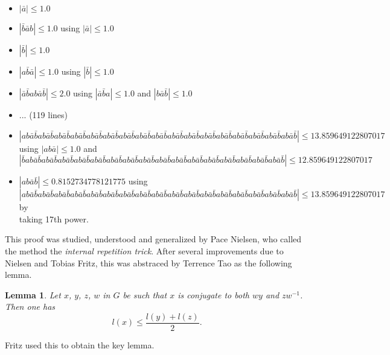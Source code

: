\documentclass{amsart}
\theoremstyle{plain}
\newtheorem{lemma}[theorem]{Lemma}
\theoremstyle{definition}
\theoremstyle{remark}
\begin{document}
{\tiny\begin{itemize}[leftmargin=*]
	\item $|\bar{a}| \leq 1.0$
	\item $|\bar{b}\bar{a}b| \leq 1.0$ using $|\bar{a}| \leq 1.0$
	\item $|\bar{b}| \leq 1.0$
	\item $|a\bar{b}\bar{a}| \leq 1.0$ using $|\bar{b}| \leq 1.0$
	\item $|\bar{a}\bar{b}ab\bar{a}\bar{b}| \leq 2.0$ using $|\bar{a}\bar{b}a| \leq 1.0$ and $|b\bar{a}\bar{b}| \leq 1.0$
	\item ... (119 lines)
	\item $|ab\bar{a}\bar{b}ab\bar{a}\bar{b}ab\bar{a}\bar{b}ab\bar{a}\bar{b}ab\bar{a}\bar{b}ab\bar{a}\bar{b}ab\bar{a}\bar{b}ab\bar{a}\bar{b}ab\bar{a}\bar{b}ab\bar{a}\bar{b}ab\bar{a}\bar{b}ab\bar{a}\bar{b}ab\bar{a}\bar{b}ab\bar{a}\bar{b}ab\bar{a}\bar{b}ab\bar{a}\bar{b}ab\bar{a}\bar{b}| \leq 13.859649122807017$ \\ using $|ab\bar{a}| \leq 1.0$ and \\ $|\bar{b}ab\bar{a}\bar{b}ab\bar{a}\bar{b}ab\bar{a}\bar{b}ab\bar{a}\bar{b}ab\bar{a}\bar{b}ab\bar{a}\bar{b}ab\bar{a}\bar{b}ab\bar{a}\bar{b}ab\bar{a}\bar{b}ab\bar{a}\bar{b}ab\bar{a}\bar{b}ab\bar{a}\bar{b}ab\bar{a}\bar{b}ab\bar{a}\bar{b}ab\bar{a}\bar{b}ab\bar{a}\bar{b}| \leq 12.859649122807017$
	\item $|ab\bar{a}\bar{b}| \leq 0.8152734778121775$ using \\ $|ab\bar{a}\bar{b}ab\bar{a}\bar{b}ab\bar{a}\bar{b}ab\bar{a}\bar{b}ab\bar{a}\bar{b}ab\bar{a}\bar{b}ab\bar{a}\bar{b}ab\bar{a}\bar{b}ab\bar{a}\bar{b}ab\bar{a}\bar{b}ab\bar{a}\bar{b}ab\bar{a}\bar{b}ab\bar{a}\bar{b}ab\bar{a}\bar{b}ab\bar{a}\bar{b}ab\bar{a}\bar{b}ab\bar{a}\bar{b}| \leq 13.859649122807017$ by \\ taking 17th power.
\end{itemize}}

This proof was studied, understood and generalized by Pace Nielsen, who called the method the \emph{internal repetition trick}. After several improvements due to Nielsen and Tobias Fritz, this was abstraced by Terrence Tao as the following lemma.
\begin{lemma}
	Let $x$, $y$, $z$, $w$ in $G$ be such that $x$ is conjugate
to both $wy$ and $zw^{-1}$. Then one has
$$l(x)\leq\frac{l(y) + l(z)}{2}.$$

\end{lemma}

Fritz used this to obtain the key lemma.
\end{document}

